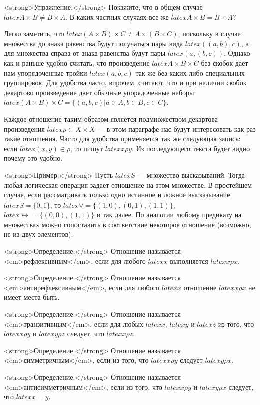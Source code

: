 <strong>Упражнение.</strong> Покажите, что в общем случае $latex A\times B \not = B \times A$. В каких частных случаях все же $latex A\times B = B \times A$?

Легко заметить, что $latex (A\times B)\times C \not= A\times (B \times C)$, поскольку в случае множества до знака равенства будут получаться пары вида $latex ((a, b), c)$, а для множества справа от знака равенства будут пары $latex (a, (b, c))$. Однако как и раньше удобно считать, что произведение $latex A\times B\times C$ без скобок дает нам упорядоченные тройки $latex (a, b, c)$ так же без каких-либо специальных группировок. Для удобства часто, впрочем, считают, что и при наличии скобок декартово произведение дает обычные упорядоченные наборы: $latex (A\times B)\times C = \{(a, b, c)|a\in A, b\in B, c\in C\}$.

Каждое отношение таким образом является подмножеством декартова произведения $latex \rho \subset X\times X$ — в этом параграфе нас будут интересовать как раз такие отношения. Часто для удобства применяется так же следующая запись: если $latex (x, y) \in \rho$, то пишут $latex x\rho y$. Из последующего текста будет видно почему это удобно.

<strong>Пример.</strong> Пусть $latex S$ — множество высказываний. Тогда любая логическая операция задает отношение на этом множестве. В простейшем случае, если рассматривать только одно истинное и ложное высказывание $latex S = \{0, 1\}$, то $latex \vee = \{(1, 0), (0, 1), (1, 1)\}$, $latex \leftrightarrow = \{(0, 0), (1, 1)\}$ и так далее. По аналогии любому предикату на множествах можно сопоставить в соответствие некоторое отношение (возможно, не из двух элементов).

<strong>Определение.</strong> Отношение называется <em>рефлексивным</em>, если для любого $latex x$ выполняется $latex x\rho x$.

<strong>Определение.</strong> Отношение называется <em>антирефлексивным</em>, если для любого $latex x$ отношение $latex x\rho x$ не имеет места быть.

<strong>Определение.</strong> Отношение называется <em>транзитивным</em>, если для любых $latex x$, $latex y$ и $latex z$ из того, что $latex x\rho y$ и $latex y \rho z$ следует, что $latex x\rho z$.

<strong>Определение.</strong> Отношение называется <em>симметричным</em>, если из того, что $latex x\rho y$ следует $latex y\rho x$.

<strong>Определение.</strong> Отношение называется <em>антисимметричным</em>, если из того, что $latex x \rho y$ и $latex y \rho x$ следует, что $latex x = y$.

